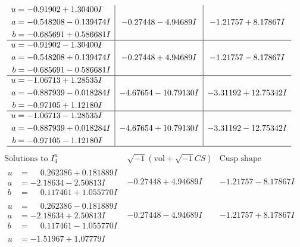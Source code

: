 \documentclass[1p]{elsarticle_modified}
\theoremstyle{definition}
\newcommand{\I}{\sqrt{-1}}
\begin{document}
$$\begin{array}{c|c|c}
\begin{aligned}
u &= -0.91902 + 1.30400 I \\
a &= -0.548208 - 0.139474 I \\
b &= -0.685691 + 0.586681 I\end{aligned}
 & -0.27448 - 4.94689 I & -1.21757 + 8.17867 I \\ \hline\begin{aligned}
u &= -0.91902 - 1.30400 I \\
a &= -0.548208 + 0.139474 I \\
b &= -0.685691 - 0.586681 I\end{aligned}
 & -0.27448 + 4.94689 I & -1.21757 - 8.17867 I \\ \hline\begin{aligned}
u &= -1.06713 + 1.28535 I \\
a &= -0.887939 - 0.018284 I \\
b &= -0.97105 + 1.12180 I\end{aligned}
 & -4.67654 - 10.79130 I & -3.31192 + 12.75342 I \\ \hline\begin{aligned}
u &= -1.06713 - 1.28535 I \\
a &= -0.887939 + 0.018284 I \\
b &= -0.97105 - 1.12180 I\end{aligned}
 & -4.67654 + 10.79130 I & -3.31192 - 12.75342 I\\
 \hline 
 \end{array}$$\newpage$$\begin{array}{c|c|c}  
\text{Solutions to }I^u_{4}& \I (\text{vol} + \sqrt{-1}CS) & \text{Cusp shape}\\
 \hline 
\begin{aligned}
u &= \phantom{-}0.262386 + 0.181889 I \\
a &= -2.18634 - 2.50813 I \\
b &= \phantom{-}0.117461 + 1.055770 I\end{aligned}
 & -0.27448 + 4.94689 I & -1.21757 - 8.17867 I \\ \hline\begin{aligned}
u &= \phantom{-}0.262386 - 0.181889 I \\
a &= -2.18634 + 2.50813 I \\
b &= \phantom{-}0.117461 - 1.055770 I\end{aligned}
 & -0.27448 - 4.94689 I & -1.21757 + 8.17867 I \\ \hline\begin{aligned}
u &= -1.51967 + 1.07779 I \\

\end{aligned}
\end{array}$$
\end{document}

